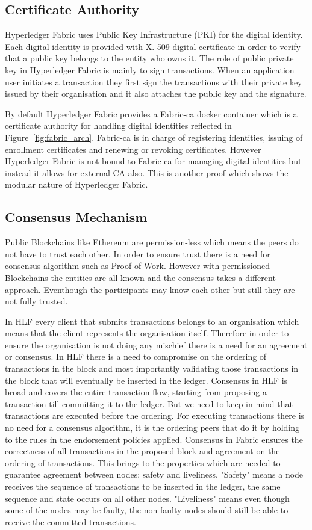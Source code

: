 \subsection{Certificate Authority}

Hyperledger Fabric uses Public Key Infrastructure (PKI) for the digital identity. Each digital identity is provided with X. 509 digital certificate in order to verify that a public key belongs to the entity who owns it. The role of public private key in Hyperledger Fabric is mainly to sign transactions. When an application user initiates a transaction they first sign the transactions with their private key issued by their organisation and it also attaches the public key and the signature. 

By default Hyperledger Fabric provides a Fabric-ca docker container which is a certificate authority for handling digital identities reflected in Figure~\ref{fig:fabric_arch}. Fabric-ca is in charge of registering identities, issuing of enrollment certificates and renewing or revoking certificates. However Hyperledger Fabric is not bound to Fabric-ca for managing digital identities but instead it allows for external CA also. This is another proof which shows the modular nature of Hyperledger Fabric. 

\subsection{Consensus Mechanism}
Public Blockchains like Ethereum are permission-less which means the peers do not have to trust each other. In order to ensure trust there is a need for consensus algorithm such as Proof of Work. However with permissioned Blockchains the entities are all known and the consensus takes a different approach.  Eventhough the participants may know each other but still they are not fully trusted. 

In HLF every client that submits transactions belongs to an organisation which means that the client represents the organisation itself. Therefore in order to ensure the organisation is not doing any mischief there is a need for an agreement or consensus.   
In HLF there is a need to compromise on the ordering of transactions in the block and most importantly validating those transactions in the block that will eventually be inserted in the ledger. Consensus in HLF is broad and covers the entire transaction flow, starting from proposing a transaction till committing it to the ledger. But we need to keep in mind that transactions are executed before the ordering. For executing transactions there is no need for a consensus algorithm, it is the ordering peers that do it by holding to the rules in the endorsement policies applied. Consensus in Fabric ensures the correctness of all transactions in the proposed block and agreement on the ordering of transactions. This brings to the properties which are needed to guarantee agreement between nodes: safety and liveliness. "Safety" means a node receives the sequence of transactions to be inserted in the ledger, the same sequence and state occurs on all other nodes. "Liveliness" means even though some of the nodes may be faulty, the non faulty nodes should still be able to receive the committed transactions. 

